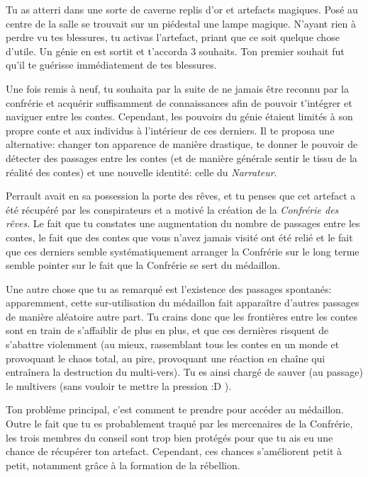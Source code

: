 {	\par Tu as atterri dans une sorte de caverne replis d'or et artefacts magiques. Posé au centre de la salle se trouvait sur un piédestal une lampe magique. N'ayant rien à perdre vu tes blessures, tu activas l'artefact, priant que ce soit quelque chose d'utile. Un génie en est sortit et t'accorda 3 souhaits. Ton premier souhait fut qu'il te guérisse immédiatement de tes blessures.
	
	\par Une fois remis à neuf, tu souhaita par la suite de ne jamais être reconnu par la confrérie et acquérir suffisamment de connaissances afin de pouvoir t'intégrer et naviguer entre les contes. Cependant, les pouvoirs du génie étaient limités à son propre conte et aux individus à l'intérieur de ces derniers. Il te proposa une alternative: changer ton apparence de manière drastique, te donner le pouvoir de détecter des passages entre les contes (et de manière générale sentir le tissu de la réalité des contes) et une nouvelle identité: celle du \emph{Narrateur}.
	
	\par Perrault avait en sa possession la porte des rêves, et tu penses que cet artefact a été récupéré par les conspirateurs et a motivé la création de la \emph{Confrérie des rêves}. Le fait que tu constates une augmentation du nombre de passages entre les contes, le fait que des contes que vous n'avez jamais visité ont été relié et le fait que ces derniers semble systématiquement arranger la Confrérie sur le long terme semble pointer sur le fait que la Confrérie se sert du médaillon.
	
	\par Une autre chose que tu as remarqué est l'existence des passages spontanés: apparemment, cette sur-utilisation du médaillon fait apparaître d'autres passages de manière aléatoire autre part. Tu crains donc que les frontières entre les contes sont en train de s'affaiblir de plus en plus, et que ces dernières risquent de s'abattre violemment (au mieux, rassemblant tous les contes en un monde et provoquant le chaos total, au pire, provoquant une réaction en chaîne qui entraînera la destruction du multi-vers). Tu es ainsi chargé de sauver (au passage) le multivers (sans vouloir te mettre la pression :D ).
	
	\par Ton problème principal, c'est comment te prendre pour accéder au médaillon. Outre le fait que tu es probablement traqué par les mercenaires de la Confrérie, les trois membres du conseil sont trop bien protégés pour que tu ais eu une chance de récupérer ton artefact. Cependant, ces chances s'améliorent petit à petit, notamment grâce à la formation de la rébellion.
	
}
